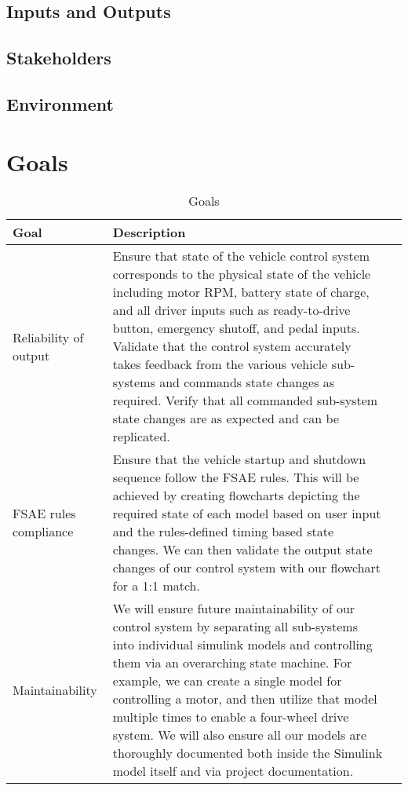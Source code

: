 \documentclass{article}
\begin{document}
\subsection{Inputs and Outputs}


\subsection{Stakeholders}

\subsection{Environment}


\section{Goals}

\begin{table}[hp]
\caption{Goals} \label{TblGoals}
\begin{tabularx}{\textwidth}{llX}
\toprule
\textbf{Goal} & \textbf{Description}\\
\midrule
Reliability of output & Ensure that state of the vehicle 
control system corresponds to the physical state of the 
vehicle including motor RPM, battery state of charge, and 
all driver inputs such as ready-to-drive button, emergency shutoff, 
and pedal inputs. Validate that the control system accurately 
takes feedback from the various vehicle sub-systems and commands 
state changes as required. Verify that all commanded sub-system 
state changes are as expected and can be replicated. \\
FSAE rules compliance & Ensure that the vehicle startup and 
shutdown sequence follow the FSAE rules. This will be achieved by 
creating flowcharts depicting the required state of each model based 
on user input and the rules-defined timing based state changes. We can 
then validate the output state changes of our control system with our 
flowchart for a 1:1 match.\\
Maintainability & We will ensure future maintainability of our control 
system by separating all sub-systems into individual simulink models and 
controlling them via an overarching state machine. For example, we can 
create a single model for controlling a motor, and then utilize that 
model multiple times to enable a four-wheel drive system. We will also 
ensure all our models are thoroughly documented both inside the Simulink 
model itself and via project documentation.\\
\bottomrule
\end{tabularx}
\end{table}
\end{document}
